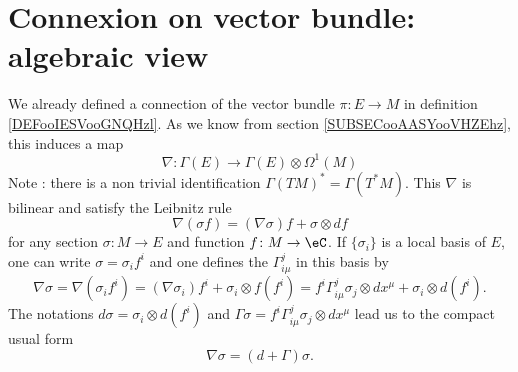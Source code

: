 \section{Connexion on vector bundle: algebraic view}

We already defined a connection of the vector bundle \( \pi\colon E\to M\) in definition \ref{DEFooIESVooGNQHzl}. As we know from section \ref{SUBSECooAASYooVHZEhz}, this induces a map
\begin{equation}        \label{EQooBRLHooJgzIyT}
    \nabla\colon \Gamma(E)\to \Gamma(E)\otimes \Omega^1(M)
\end{equation}
Note : there is a non trivial identification \( \Gamma(TM)^*=\Gamma(T^*M)\). This \( \nabla\) is bilinear and satisfy the Leibnitz rule
\begin{equation}
\nabla(\sigma f)=(\nabla\sigma)f+\sigma\otimes df
\end{equation}
for any section $\sigma\colon M\to E$ and function $f\colon M\to \eC$. If $\{ \sigma_i \}$ is a local basis of $E$, one can write $\sigma=\sigma_if^i$ and one defines the  $\Gamma_{i\mu}^{j}$ in this basis by
\begin{equation}
\nabla \sigma=\nabla (\sigma_if^i)
		=(\nabla \sigma_i)f^i+\sigma_i\otimes f(f^i)
		=f^i\Gamma_{i\mu}^{j}\sigma_j\otimes dx^{\mu}+\sigma_i\otimes d(f^i).
\end{equation}
The notations $d\sigma=\sigma_i\otimes d(f^i)$ and $\Gamma\sigma=f^i\Gamma_{i\mu}^{j}\sigma_j\otimes dx^{\mu}$ lead us to the compact usual form
\[ 
  \nabla\sigma=(d+\Gamma)\sigma.
\]

